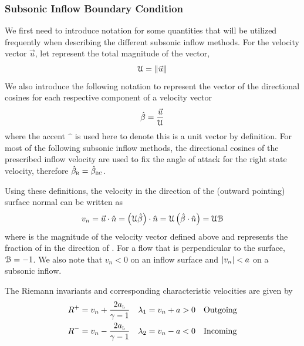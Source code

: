 \subsubsection{Subsonic Inflow Boundary Condition}
\label{SEC:BC:Inflow:Subsonic}

We first need to introduce notation for some quantities that will be utilized
frequently when describing the different subsonic inflow methods.
%
For the velocity vector $\vec{u}$, let \vmag{} represent the total magnitude of
the vector, \thatis
%
\[ \mathcal{U} = \left\|\vec{u}\right\| \]
%
We also introduce the following notation to represent the vector of the
directional cosines for each respective component of a velocity vector
%
\begin{equation}
  \hat{\beta} = \frac{\vec{u}}{\mathcal{U}}
  \label{EQ:BC:Inflow:Subsonic:DirCosines}
\end{equation}
%
where the accent ${\hat{\phantom{a}}}$ is used here to denote this is a unit
vector by definition.
%
For most of the following subsonic inflow methods, the directional cosines of
the prescribed inflow velocity are used to fix the angle of attack for the right
state velocity, therefore $\hat{\beta}_{\textsc{r}}=\hat{\beta}_{\textsc{bc}}$.


Using these definitions, the velocity in the direction of the
(outward pointing) surface normal can be written as
%
\begin{equation}
  v_n = \vec{u}\cdot\hat{n}
      = \left(\mathcal{U}\hat{\beta}\right)\cdot\hat{n}
      = \mathcal{U}\left(\hat{\beta}\cdot\hat{n}\right)
      = \mathcal{U}\mathcal{B}
  \label{EQ:BC:Inflow:Subsonic:NormalVelocity}
\end{equation}
%
where
\vmag{} is the magnitude of the velocity vector defined above and
\dcnorm{} represents the fraction of \vmag{} in the direction of \normal.
%
For a flow that is perpendicular to the surface, $\mathcal{B}{} = -1$.
%
We also note that $v_n < 0$ on an inflow surface and
$\left|v_n\right| < a$ on a subsonic inflow.



The Riemann invariants and corresponding characteristic velocities are
given by
%
\begin{align}
      R^+       &= v_n + \frac{2a_{\textsc{l}}}{\gamma-1}
  &   \lambda_1 &= v_n + a > 0
  &&  \text{Outgoing}
  \\
      R^-       &= v_n - \frac{2a_{\textsc{l}}}{\gamma-1}
  &   \lambda_2 &= v_n - a < 0
  &&  \text{Incoming}
\end{align}

